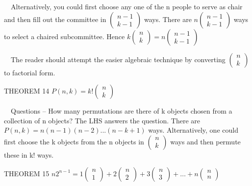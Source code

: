 \documentclass{article}
\begin{document}
\ \ Alternatively, you could first choose any one of the  n  people to serve as chair and then fill out the committee in
 $\left(\begin{matrix}n-1\\k-1\end{matrix}\right)$ ways.  There are  $n\left(\begin{matrix}n-1\\k-1\end{matrix}\right)$
ways to select a chaired subcommittee.  Hence 
$k\left(\begin{matrix}n\\k\end{matrix}\right)=n\left(\begin{matrix}n-1\\k-1\end{matrix}\right)$

\ \ The reader should attempt the easier algebraic technique by converting 
$\left(\begin{matrix}n\\k\end{matrix}\right)$ to factorial form.

THEOREM 14   $P\left(n,k\right)=k!\left(\begin{matrix}n\\k\end{matrix}\right)$

\ \ Questions – How many permutations are there of k objects chosen from a collection of  n objects?  The LHS answers
the question.  There are  $P\left(n,k\right)=n\left(n-1\right)\left(n-2\right)...(n-k+1)$ ways.  Alternatively, one
could first choose the k objects from the n objects in  $\left(\begin{matrix}n\\k\end{matrix}\right)$ ways and then
permute these in k! ways.

THEOREM 15  
$n2^{n-1}=1\left(\begin{matrix}n\\1\end{matrix}\right)+2\left(\begin{matrix}n\\2\end{matrix}\right)+3\left(\begin{matrix}n\\3\end{matrix}\right)+{\dots}+n\left(\begin{matrix}n\\n\end{matrix}\right)$
\end{document}
